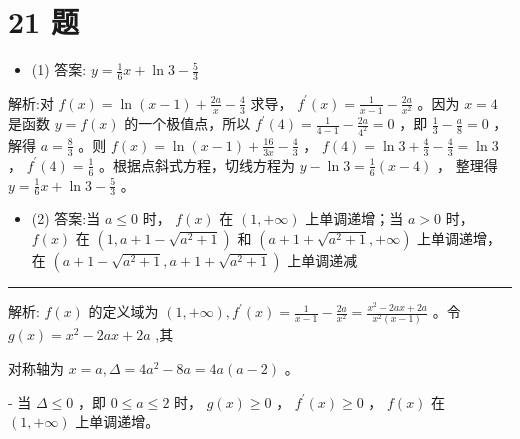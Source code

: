 \documentclass[10pt]{article}
\newcommand{\HRule}{\begin{center}\rule{0.9\linewidth}{0.2mm}\end{center}}
\begin{document}
\section*{21 题}

\begin{itemize}\relax
\item\relax (1) 答案: \(y = \frac{1}{6}x + \ln 3 - \frac{5}{3}\)
\end{itemize}

解析:对 \(f\left( x\right)  = \ln \left( {x - 1}\right)  + \frac{2a}{x} - \frac{4}{3}\) 求导， \({f}^{\prime }\left( x\right)  = \frac{1}{x - 1} - \frac{2a}{{x}^{2}}\) 。因为 \(x = 4\) 是函数 \(y = f\left( x\right)\) 的一个极值点，所以 \({f}^{\prime }\left( 4\right)  = \frac{1}{4 - 1} - \frac{2a}{{4}^{2}} = 0\) ，即 \(\frac{1}{3} - \frac{a}{8} = 0\) ，解得 \(a = \frac{8}{3}\) 。则 \(f\left( x\right)  = \ln \left( {x - 1}\right)  + \frac{16}{3x} - \frac{4}{3}\) ， \(f\left( 4\right)  = \ln 3 + \frac{4}{3} - \frac{4}{3} = \ln 3\) ， \({f}^{\prime }\left( 4\right)  = \frac{1}{6}\) 。根据点斜式方程，切线方程为 \(y - \ln 3 = \frac{1}{6}\left( {x - 4}\right)\) ， 整理得 \(y = \frac{1}{6}x + \ln 3 - \frac{5}{3}\) 。

\begin{itemize}\relax
\item\relax (2) 答案:当 \(a \leq  0\) 时， \(f\left( x\right)\) 在 \(\left( {1, + \infty }\right)\) 上单调递增；当 \(a > 0\) 时， \(f\left( x\right)\) 在 \(\left( {1,a + 1 - \sqrt{{a}^{2} + 1}}\right)\) 和 \(\left( {a + 1 + \sqrt{{a}^{2} + 1}, + \infty }\right)\) 上单调递增，在 \(\left( {a + 1 - \sqrt{{a}^{2} + 1},a + 1 + \sqrt{{a}^{2} + 1}}\right)\) 上单调递减
\end{itemize}

\HRule

\hspace*{2em} 解析: \(f\left( x\right)\) 的定义域为 \(\left( {1, + \infty }\right) ,{f}^{\prime }\left( x\right)  = \frac{1}{x - 1} - \frac{2a}{{x}^{2}} = \frac{{x}^{2} - {2ax} + {2a}}{{x}^{2}\left( {x - 1}\right) }\) 。令 \(g\left( x\right)  = {x}^{2} - {2ax} + {2a}\) ,其

\hspace*{2em} 对称轴为 \(x = a,\Delta  = 4{a}^{2} - {8a} = {4a}\left( {a - 2}\right)\) 。

\hspace*{3em} - 当 \(\Delta  \leq  0\) ，即 \(0 \leq  a \leq  2\) 时， \(g\left( x\right)  \geq  0\) ， \({f}^{\prime }\left( x\right)  \geq  0\) ， \(f\left( x\right)\) 在 \(\left( {1, + \infty }\right)\) 上单调递增。
\end{document}
